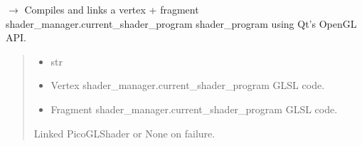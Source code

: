 \documentclass[a4paper,10pt,english,openany,oneside]{sphinxmanual}
\begin{document}
\begin{fulllineitems}
\label{\detokenize{api/shaders:picogl.shaders.compile.compile_shaders}}
\pysigstartsignatures
\pysiglinewithargsret
{}
{\sphinxparamcomma {}\sphinxparamcomma {}}
{{ $\rightarrow$ {\hyperref[\detokenize{api/shaders:picogl.backend.modern.core.shader.program.ShaderProgram}]{}}}}
\pysigstopsignatures
\sphinxAtStartPar
Compiles and links a vertex + fragment shader\_manager.current\_shader\_program shader\_program using Qt’s OpenGL API.
\begin{quote}\begin{description}
\begin{itemize}
\item {} 
\sphinxAtStartPar
{} \textendash{} str

\item {} 
\sphinxAtStartPar
{} \textendash{} Vertex shader\_manager.current\_shader\_program GLSL code.

\item {} 
\sphinxAtStartPar
{} \textendash{} Fragment shader\_manager.current\_shader\_program GLSL code.

\end{itemize}

\sphinxAtStartPar
Linked PicoGLShader or None on failure.

\end{description}\end{quote}

\end{fulllineitems}
\end{document}
